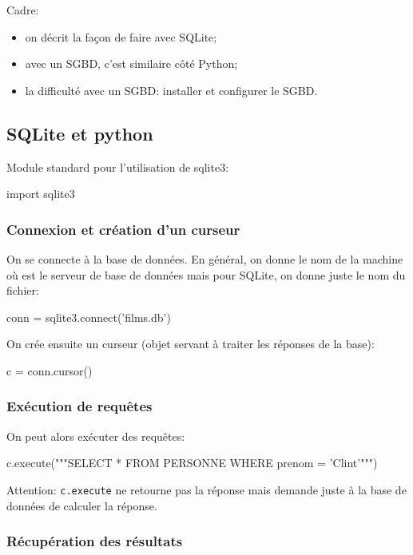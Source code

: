 Cadre:
\begin{itemize}
\item on décrit la façon de faire avec SQLite;
\item avec un SGBD, c'est similaire côté Python;
\item la difficulté avec un SGBD: installer et configurer le SGBD.
\end{itemize}

\subsection{SQLite et python}

Module standard pour l'utilisation de sqlite3:
\begin{pyverbatim}
import sqlite3
\end{pyverbatim}

\subsubsection{Connexion et création d'un curseur}
On se connecte à la base de données. En général, on donne le nom de la
machine où est le serveur de base de données mais pour SQLite, on
donne juste le nom du fichier:
\begin{pyverbatim}
conn = sqlite3.connect('films.db')
\end{pyverbatim}

On crée ensuite un curseur (objet servant à traiter les réponses de la
base):
\begin{pyverbatim}
c = conn.cursor()  
\end{pyverbatim}

\subsubsection{Exécution de requêtes}
On peut alors exécuter des requêtes:
\begin{pyverbatim}
c.execute("""SELECT * FROM PERSONNE
  WHERE prenom = 'Clint'""")
\end{pyverbatim}

Attention: \lstinline{c.execute} ne retourne pas la réponse mais
demande juste à la base de données de calculer la réponse.

\subsubsection{Récupération des résultats}

